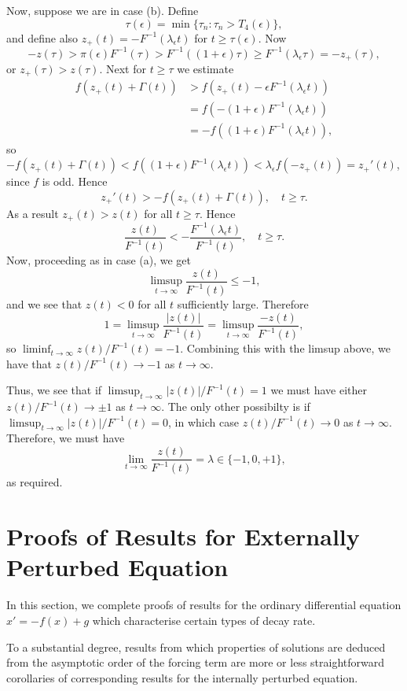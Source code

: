 \documentclass[a4paper,10pt,reqno]{amsart}
\numberwithin{equation}{section}
\theoremstyle{definition}
\theoremstyle{remark}
\DeclareMathOperator{\1}{\mathbbm 1}
\begin{document}
	Now, suppose we are in case (b). 
	Define 
	\[
	\tau(\epsilon)=\min\{\tau_n:\tau_n>T_4(\epsilon)\},
	\]
	and define also $z_+(t)=-F^{-1}(\lambda_\epsilon t)$ for $t\geq \tau(\epsilon)$. Now
	\[
	-z(\tau)>\pi(\epsilon)F^{-1}(\tau)>F^{-1}((1+\epsilon)\tau)\geq F^{-1}(\lambda_\epsilon \tau)=-z_+(\tau),
	\]
	or $z_+(\tau)>z(\tau)$. Next for $t\geq \tau$ we estimate
	\begin{align*}
		f(z_+(t)+\Gamma(t))&> f(z_+(t)-\epsilon F^{-1}(\lambda_\epsilon t))\\
		&=f(-(1+\epsilon)F^{-1}(\lambda_\epsilon t))\\
		&=-f((1+\epsilon)F^{-1}(\lambda_\epsilon t)),
	\end{align*}
	so $-f(z_+(t)+\Gamma(t))<f((1+\epsilon)F^{-1}(\lambda_\epsilon t))<\lambda_\epsilon f(-z_+(t))=z_+'(t)$, since $f$ is odd. 
	Hence 
	\[
	z_+'(t)>-f(z_+(t)+\Gamma(t)), \quad t\geq \tau.
	\]
	As a result $z_+(t)>z(t)$ for all $t\geq \tau$. Hence
	\[
	\frac{z(t)}{F^{-1}(t)}<-\frac{F^{-1}(\lambda_\epsilon t)}{F^{-1}(t)}, \quad t\geq \tau.
	\]
	Now, proceeding as in case (a), we get 
	\[
	\limsup_{t\to\infty} \frac{z(t)}{F^{-1}(t)}\leq -1,
	\]
	and we see that $z(t)<0$ for all $t$ sufficiently large. Therefore
	\[
	1=\limsup_{t\to\infty} \frac{|z(t)|}{F^{-1}(t)}=\limsup_{t\to\infty} \frac{-z(t)}{F^{-1}(t)},
	\]
	so $\liminf_{t\to\infty} z(t)/F^{-1}(t)=-1$. Combining this with the limsup above, we have that $z(t)/F^{-1}(t)\to -1$ as $t\to\infty$. 
	
	Thus, we see that if $\limsup_{t\to\infty} |z(t)|/F^{-1}(t)=1$ we must have either $z(t)/F^{-1}(t)\to \pm1$ as $t\to\infty$. The only other possibilty is if $\limsup_{t\to\infty} |z(t)|/F^{-1}(t)=0$, in which case $z(t)/F^{-1}(t)\to 0$ as $t\to\infty$. Therefore, we must have 
	\[
	\lim_{t\to\infty} \frac{z(t)}{F^{-1}(t)}=\lambda\in \{-1,0,+1\},
	\]
	as required.
	
	\section{Proofs of Results for Externally Perturbed Equation}
	In this section, we complete proofs of results for the ordinary differential equation $x'=-f(x)+g$ which characterise certain types of decay rate. 
	
	To a substantial degree, results from which properties of solutions are deduced from the asymptotic order of the forcing term are more or less straightforward corollaries of corresponding results for the internally perturbed equation. 
	
\end{document}
